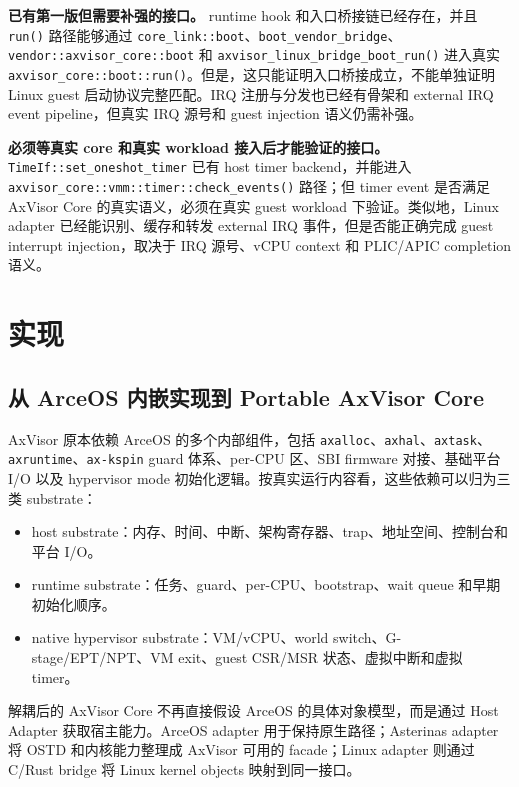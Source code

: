 \documentclass[a4paper,11pt]{article}
\begin{document}
\textbf{已有第一版但需要补强的接口。}
runtime hook 和入口桥接链已经存在，并且 \texttt{run()} 路径能够通过 \texttt{core\_link::boot}、\texttt{boot\_vendor\_bridge}、\texttt{vendor::axvisor\_core::boot} 和 \texttt{axvisor\_linux\_bridge\_boot\_run()} 进入真实 \texttt{axvisor\_core::boot::run()}。但是，这只能证明入口桥接成立，不能单独证明 Linux guest 启动协议完整匹配。IRQ 注册与分发也已经有骨架和 external IRQ event pipeline，但真实 IRQ 源号和 guest injection 语义仍需补强。

\textbf{必须等真实 core 和真实 workload 接入后才能验证的接口。}
\texttt{TimeIf::set\_oneshot\_timer} 已有 host timer backend，并能进入 \texttt{axvisor\_core::vmm::timer::check\_events()} 路径；但 timer event 是否满足 AxVisor Core 的真实语义，必须在真实 guest workload 下验证。类似地，Linux adapter 已经能识别、缓存和转发 external IRQ 事件，但是否能正确完成 guest interrupt injection，取决于 IRQ 源号、vCPU context 和 PLIC/APIC completion 语义。

\section{实现}

\subsection{从 ArceOS 内嵌实现到 Portable AxVisor Core}

AxVisor 原本依赖 ArceOS 的多个内部组件，包括 \texttt{axalloc}、\texttt{axhal}、\texttt{axtask}、\texttt{axruntime}、\texttt{ax-kspin} guard 体系、per-CPU 区、SBI firmware 对接、基础平台 I/O 以及 hypervisor mode 初始化逻辑。按真实运行内容看，这些依赖可以归为三类 substrate：

\begin{itemize}
  \item host substrate：内存、时间、中断、架构寄存器、trap、地址空间、控制台和平台 I/O。
  \item runtime substrate：任务、guard、per-CPU、bootstrap、wait queue 和早期初始化顺序。
  \item native hypervisor substrate：VM/vCPU、world switch、G-stage/EPT/NPT、VM exit、guest CSR/MSR 状态、虚拟中断和虚拟 timer。
\end{itemize}

解耦后的 AxVisor Core 不再直接假设 ArceOS 的具体对象模型，而是通过 Host Adapter 获取宿主能力。ArceOS adapter 用于保持原生路径；Asterinas adapter 将 OSTD 和内核能力整理成 AxVisor 可用的 facade；Linux adapter 则通过 C/Rust bridge 将 Linux kernel objects 映射到同一接口。
\end{document}

